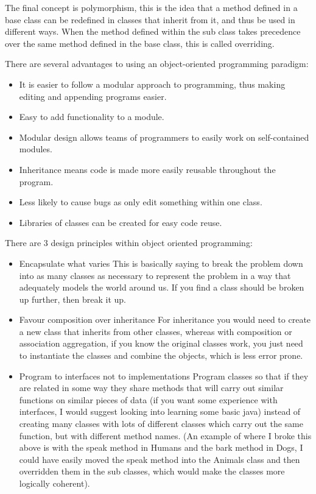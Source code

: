   	The final concept is polymorphism, this is the idea that a method defined in a base class can be redefined in classes that inherit from it, and thus be used in different ways. When the method defined within the sub class takes precedence over the same method defined in the base class, this is called overriding.

  	There are several advantages to using an object-oriented programming paradigm:
  	\begin{itemize}
  		\item It is easier to follow a modular approach to programming, thus making editing and appending programs easier.
  		\item Easy to add functionality to a module.
  		\item Modular design allows teams of programmers to easily work on self-contained modules.
  		\item Inheritance means code is made more easily reusable throughout the program.
  		\item Less likely to cause bugs as only edit something within one class.
  		\item Libraries of classes can be created for easy code reuse.
  	\end{itemize}

  	There are 3 design principles within object oriented programming:
  	\begin{itemize}
  		\item Encapsulate what varies
  		\subitem This is basically saying to break the problem down into as many classes as necessary to represent the problem in a way that adequately models the world around us. If you find a class should be broken up further, then break it up.
  		\item Favour composition over inheritance
  		\subitem For inheritance you would need to create a new class that inherits from other classes, whereas with composition or association aggregation, if you know the original classes work, you just need to instantiate the classes and combine the objects, which is less error prone.
  		\item Program to interfaces not to implementations
  		\subitem Program classes so that if they are related in some way they share methods that will carry out similar functions on similar pieces of data (if you want some experience with interfaces, I would suggest looking into learning some basic java) instead of creating many classes with lots of different classes which carry out the same function, but with different method names. (An example of where I broke this above is with the speak method in Humans and the bark method in Dogs, I could have easily moved the speak method into the Animals class and then overridden them in the sub classes, which would make the classes more logically coherent).
  	\end{itemize}

